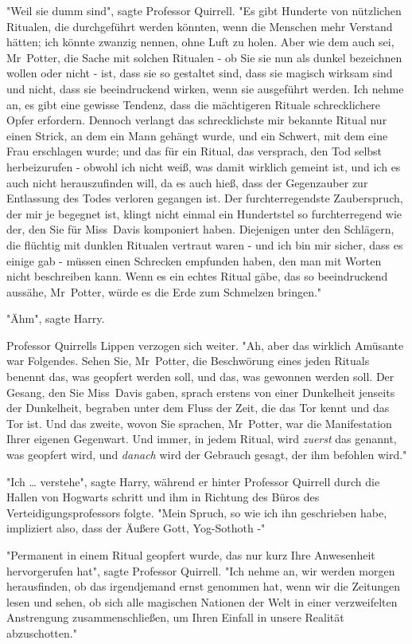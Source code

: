 {"Weil sie dumm sind", sagte Professor Quirrell. "Es gibt Hunderte von nützlichen Ritualen, die durchgeführt werden könnten, wenn die Menschen mehr Verstand hätten; ich könnte zwanzig nennen, ohne Luft zu holen. Aber wie dem auch sei, Mr~Potter, die Sache mit solchen Ritualen - ob Sie sie nun als dunkel bezeichnen wollen oder nicht - ist, dass sie so gestaltet sind, dass sie magisch wirksam sind und nicht, dass sie beeindruckend wirken, wenn sie ausgeführt werden. Ich nehme an, es gibt eine gewisse Tendenz, dass die mächtigeren Rituale schrecklichere Opfer erfordern. Dennoch verlangt das schrecklichste mir bekannte Ritual nur einen Strick, an dem ein Mann gehängt wurde, und ein Schwert, mit dem eine Frau erschlagen wurde; und das für ein Ritual, das versprach, den Tod selbst herbeizurufen - obwohl ich nicht weiß, was damit wirklich gemeint ist, und ich es auch nicht herauszufinden will, da es auch hieß, dass der Gegenzauber zur Entlassung des Todes verloren gegangen ist. Der furchterregendste Zauberspruch, der mir je begegnet ist, klingt nicht einmal ein Hundertstel so furchterregend wie der, den Sie für Miss~Davis komponiert haben. Diejenigen unter den Schlägern, die flüchtig mit dunklen Ritualen vertraut waren - und ich bin mir sicher, dass es einige gab - müssen einen Schrecken empfunden haben, den man mit Worten nicht beschreiben kann. Wenn es ein echtes Ritual gäbe, das so beeindruckend aussähe, Mr~Potter, würde es die Erde zum Schmelzen bringen."

"Ähm", sagte Harry.

Professor Quirrells Lippen verzogen sich weiter. "Ah, aber das wirklich Amüsante war Folgendes. Sehen Sie, Mr~Potter, die Beschwörung eines jeden Rituals benennt das, was geopfert werden soll, und das, was gewonnen werden soll. Der Gesang, den Sie Miss~Davis gaben, sprach erstens von einer Dunkelheit jenseits der Dunkelheit, begraben unter dem Fluss der Zeit, die das Tor kennt und das Tor ist. Und das zweite, wovon Sie sprachen, Mr~Potter, war die Manifestation Ihrer eigenen Gegenwart. Und immer, in jedem Ritual, wird \emph{zuerst} das genannt, was geopfert wird, und \emph{danach} wird der Gebrauch gesagt, der ihm befohlen wird."

"Ich … verstehe", sagte Harry, während er hinter Professor Quirrell durch die Hallen von Hogwarts schritt und ihm in Richtung des Büros des Verteidigungsprofessors folgte. "Mein Spruch, so wie ich ihn geschrieben habe, impliziert also, dass der Äußere Gott, Yog-Sothoth -"

"Permanent in einem Ritual geopfert wurde, das nur kurz Ihre Anwesenheit hervorgerufen hat", sagte Professor Quirrell. "Ich nehme an, wir werden morgen herausfinden, ob das irgendjemand ernst genommen hat, wenn wir die Zeitungen lesen und sehen, ob sich alle magischen Nationen der Welt in einer verzweifelten Anstrengung zusammenschließen, um Ihren Einfall in unsere Realität abzuschotten."

}
